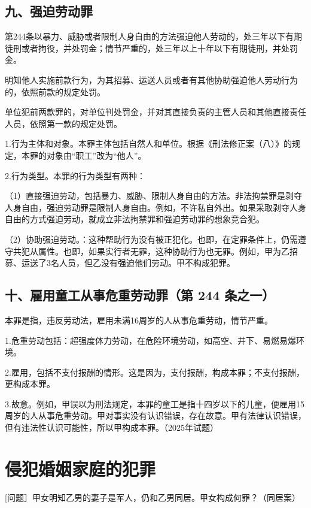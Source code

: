 \subsection*{九、强迫劳动罪}

第244条以暴力、威胁或者限制人身自由的方法强迫他人劳动的，处三年以下有期徒刑或者拘役，并处罚金；情节严重的，处三年以上十年以下有期徒刑，并处罚金。

明知他人实施前款行为，为其招募、运送人员或者有其他协助强迫他人劳动行为的，依照前款的规定处罚。

单位犯前两款罪的，对单位判处罚金，并对其直接负责的主管人员和其他直接责任人员，依照第一款的规定处罚。

1.行为主体和对象。本罪主体包括自然人和单位。根据《刑法修正案（八）》的规定，本罪的对象由“职工”改为“他人”。

2.行为类型。本罪的行为类型有两种：

（1）直接强迫劳动，包括暴力、威胁、限制人身自由的方法。非法拘禁罪是剥夺人身自由，强迫劳动罪是限制人身自由。例如，不许私自外出。如果采取剥夺人身自由的方式强迫劳动，就成立非法拘禁罪和强迫劳动罪的想象竞合犯。

（2）协助强迫劳动。：这种帮助行为没有被正犯化。也即，在定罪条件上，仍需遵守共犯从属性。也即，如果实行者无罪，这种协助行为也无罪。例如，甲为乙招募、运送了3名人员，但乙没有强迫他们劳动。甲不构成犯罪。

\subsection*{十、雇用童工从事危重劳动罪（第 244 条之一）}

本罪是指，违反劳动法，雇用未满16周岁的人从事危重劳动，情节严重。

1.危重劳动包括：超强度体力劳动，在危险环境劳动，如高空、井下、易燃易爆环境。

2.雇用，包括不支付报酬的情形。这是因为，支付报酬，构成本罪；不支付报酬，更构成本罪。

3.故意。例如，甲误以为刑法规定，本罪的童工是指十四岁以下的儿童，便雇用15周岁的人从事危重劳动。甲对事实没有认识错误，存在故意。甲有法律认识错误，但有违法性认识可能性，所以甲构成本罪。（2025年试题）

\section{侵犯婚姻家庭的犯罪}

[问题］甲女明知乙男的妻子是军人，仍和乙男同居。甲女构成何罪？（同居案）

